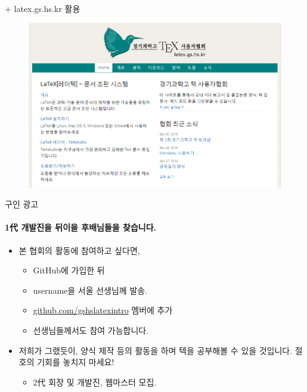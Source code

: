 \documentclass[12pt]{beamer}
\begin{document}
\begin{frame}{+ latex.gs.hs.kr 활용}
	\begin{figure}[h]
		\centering
		\includegraphics[width=\textwidth]{homepage.png}
	\end{figure}
\end{frame}
\begin{frame}{구인 광고}
	\framesubtitle{1代 개발진을 뒤이을 후배님들을 찾습니다.}
	\begin{itemize}
		\item 본 협회의 활동에 참여하고 싶다면,
		\begin{itemize}
			\item GitHub에 가입한 뒤
			\item username을 서울 선생님께 발송.
			\item \url{github.com/gshslatexintro} 멤버에 추가
			\item 선생님들께서도 참여 가능합니다.
		\end{itemize}
		\item 저희가 그랬듯이, 양식 제작 등의 활동을 하며 텍을 공부해볼 수 있을 것입니다. 절호의 기회를 놓치지 마세요!
		\begin{itemize}
			\item 2代 회장 및 개발진, 웹마스터 모집.
		\end{itemize}
	\end{itemize}
\end{frame}
\end{document}
